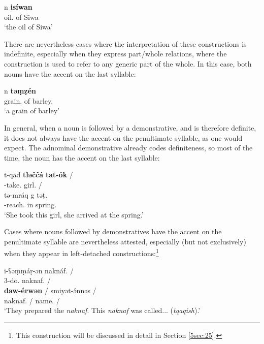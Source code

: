 \documentclass[output=paper]{langsci/langscibook}
\begin{document}
\begin{exe}
\ex\label{5ex:24}
	n	{\bf{isíwan}} \\
	oil.{}	of	Siwa \\
\glt	`the oil of Siwa'
\end{exe}

There are nevertheless cases where the interpretation of these constructions is indefinite, especially when they express part/whole relations, where the construction is used to refer to any generic part of the whole. In this case, both nouns have the accent on the last syllable:

\begin{exe}
\ex\label{5ex:25}
	n	{\bf{təṃẓén}} \\
	grain.{}	of	barley.{} \\
\glt	`a grain of barley'
\end{exe}

In general, when a noun is followed by a demonstrative, and is therefore definite, it does not always have the accent on the penultimate syllable, as one would expect. The adnominal demonstrative already codes definiteness, so most of the time, the noun has the accent on the last syllable:

\begin{exe}
\ex\label{5ex:26}
\gll	t-qad		{\bf{tləččá}}	{\bf{tat-ók}}	/ \\
	{}-take.{}	girl.{}	{}	/ \\
\glt 
\exi{}
\gll	tə-mráq	g	təṭ. \\
	{}-reach.{}	in	spring.{} \\
\glt	`She took this girl, she arrived at the spring.'
\end{exe}

Cases where nouns followed by demonstratives have the accent on the penultimate syllable are nevertheless attested, especially (but not exclusively) when they appear in left-detached constructions:\footnote{This construction will be discussed in detail in Section \ref{5sec:25}.}

\begin{exe}
\ex\label{5ex:27}
\gll	i-ʕəṃṃáṛ-ən	naknáf.	/ \\
	3-do.{}	naknaf.{}	/ \\
\glt
\exi{}
	{\bf{daw-érwən}}	/	smiyət-ə́nnəs	/ \\
	naknaf.{}	{}	/	name.{}	/ \\
\glt	`They prepared the {\emph{naknaf}}. This {\emph{naknaf}} was called... ({\emph{tqaqish}}).'
\end{exe}
\end{document}
